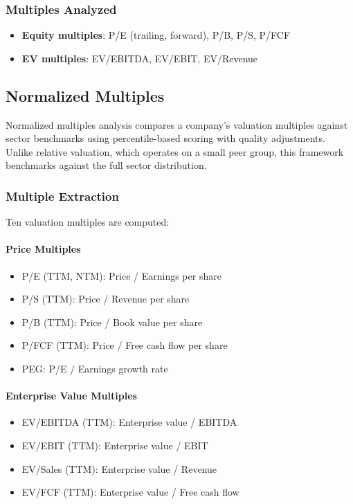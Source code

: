 \subsubsection{Multiples Analyzed}

\begin{itemize}
  \item \textbf{Equity multiples}: P/E (trailing, forward), P/B, P/S, P/FCF
  \item \textbf{EV multiples}: EV/EBITDA, EV/EBIT, EV/Revenue
\end{itemize}

\newpage\subsection{Normalized Multiples}

Normalized multiples analysis compares a company's valuation multiples against sector benchmarks using percentile-based scoring with quality adjustments. Unlike relative valuation, which operates on a small peer group, this framework benchmarks against the full sector distribution.

\subsubsection{Multiple Extraction}

Ten valuation multiples are computed:

\paragraph{Price Multiples}

\begin{itemize}
  \item P/E (TTM, NTM): Price / Earnings per share
  \item P/S (TTM): Price / Revenue per share
  \item P/B (TTM): Price / Book value per share
  \item P/FCF (TTM): Price / Free cash flow per share
  \item PEG: P/E / Earnings growth rate
\end{itemize}

\paragraph{Enterprise Value Multiples}

\begin{itemize}
  \item EV/EBITDA (TTM): Enterprise value / EBITDA
  \item EV/EBIT (TTM): Enterprise value / EBIT
  \item EV/Sales (TTM): Enterprise value / Revenue
  \item EV/FCF (TTM): Enterprise value / Free cash flow
\end{itemize}

